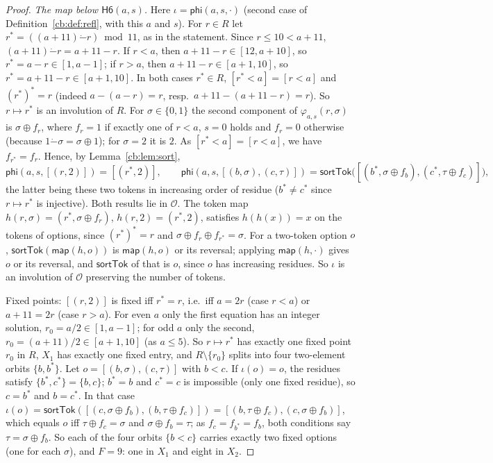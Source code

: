 \begin{proof}
\emph{The map below $\mathsf{H6}(a,s)$.} Here $\iota=\mathsf{phi}(a,s,\cdot)$ (second case of
Definition~\ref{cb:def:refl}, with this $a$ and $s$). For $r\in R$ let $r^*=((a+11)\mathbin{\dot-}r)\bmod11$, as
in the statement. Since $r\le10<a+11$, $(a+11)\mathbin{\dot-}r=a+11-r$. If $r<a$, then $a+11-r\in[12,a+10]$, so $r^*=a-r\in[1,a-1]$; if $r>a$,
then $a+11-r\in[a+1,10]$, so $r^*=a+11-r\in[a+1,10]$. In both cases $r^*\in R$, $[r^*<a]=[r<a]$ and $(r^*)^*=r$ (indeed
$a-(a-r)=r$, resp.\ $a+11-(a+11-r)=r$). So $r\mapsto r^*$ is an involution of $R$. For $\sigma\in\{0,1\}$ the second
component of $\varphi_{a,s}(r,\sigma)$ is $\sigma\oplus f_r$, where $f_r=1$ if exactly one of $r<a$, $s=0$ holds and
$f_r=0$ otherwise (because $1\mathbin{\dot-}\sigma=\sigma\oplus1$); for $\sigma=2$ it is $2$. As $[r^*<a]=[r<a]$, we
have $f_{r^*}=f_r$. Hence, by Lemma~\ref{cb:lem:sort},
\[
\mathsf{phi}(a,s,[(r,2)])=[(r^*,2)],\qquad
\mathsf{phi}(a,s,[(b,\sigma),(c,\tau)])=\mathsf{sortTok}\big([(b^*,\sigma\oplus f_b),(c^*,\tau\oplus f_c)]\big),
\]
the latter being these two tokens in increasing order of residue ($b^*\ne c^*$ since $r\mapsto r^*$ is injective).
Both results lie in $\mathcal O$. The token map $h(r,\sigma)=(r^*,\sigma\oplus f_r)$, $h(r,2)=(r^*,2)$, satisfies
$h(h(x))=x$ on the tokens of options, since $(r^*)^*=r$ and $\sigma\oplus f_r\oplus f_{r^*}=\sigma$. For a two-token
option $o$, $\mathsf{sortTok}(\mathsf{map}(h,o))$ is $\mathsf{map}(h,o)$ or its reversal; applying $\mathsf{map}(h,\cdot)$
gives $o$ or its reversal, and $\mathsf{sortTok}$ of that is $o$, since $o$ has increasing residues. So $\iota$ is an
involution of $\mathcal O$ preserving the number of tokens.

Fixed points: $[(r,2)]$ is fixed iff $r^*=r$, i.e.\ iff $a=2r$ (case $r<a$) or $a+11=2r$ (case $r>a$). For even $a$
only the first equation has an integer solution, $r_0=a/2\in[1,a-1]$; for odd $a$ only the second,
$r_0=(a+11)/2\in[a+1,10]$ (as $a\le5$). So $r\mapsto r^*$ has exactly one fixed point $r_0$ in $R$, $X_1$ has exactly
one fixed entry, and $R\setminus\{r_0\}$ splits into four two-element orbits $\{b,b^*\}$. Let $o=[(b,\sigma),(c,\tau)]$
with $b<c$. If $\iota(o)=o$, the residues satisfy $\{b^*,c^*\}=\{b,c\}$; $b^*=b$ and $c^*=c$ is impossible (only one
fixed residue), so $c=b^*$ and $b=c^*$. In that case
$\iota(o)=\mathsf{sortTok}([(c,\sigma\oplus f_b),(b,\tau\oplus f_c)])=[(b,\tau\oplus f_c),(c,\sigma\oplus f_b)]$,
which equals $o$ iff $\tau\oplus f_c=\sigma$ and $\sigma\oplus f_b=\tau$; as $f_c=f_{b^*}=f_b$, both conditions say
$\tau=\sigma\oplus f_b$. So each of the four orbits $\{b<c\}$ carries exactly two fixed options (one for each
$\sigma$), and $F=9$: one in $X_1$ and eight in $X_2$.


\end{proof}

